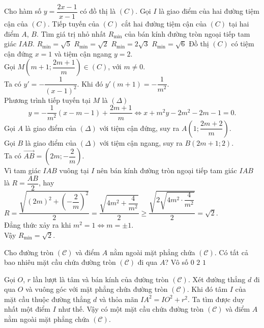 \begin{ex}%
 Cho hàm số $y=\dfrac{2x-1}{x-1}$ có đồ thị là $(C)$. Gọi $I$ là giao điểm của hai đường tiệm cận của $(C)$. Tiếp tuyến của $(C)$ cắt hai đường tiệm cận của $(C)$ tại hai điểm $A$, $B$. Tìm giá trị nhỏ nhất $R_{\min}$ của bán kính đường tròn ngoại tiếp tam giác $IAB$.
 \choice
  {$R_{\min}=\sqrt{5}$}
  {\True $R_{\min}=\sqrt{2}$}
  {$R_{\min}=2\sqrt{3}$}
  {$R_{\min}=\sqrt{6}$}
 \loigiai
  {
  Đồ thị $(C)$ có tiệm cận đứng $x=1$ và tiệm cận ngang $y = 2$.\\
  Gọi $M \left(m+1;\dfrac{2m+1}{m} \right) \in (C)$, với $m \neq 0$.\\
  Ta có $y' = -\dfrac{1}{(x-1)^2}$. Khi đó $y'(m+1) = -\dfrac{1}{m^2}$.\\
  Phương trình tiếp tuyến tại $M$ là $(\Delta)$
  $$y = -\dfrac{1}{m^2}(x-m-1)+\dfrac{2m+1}{m} \Leftrightarrow x + m^2y - 2m^2 - 2m - 1 = 0.$$
  Gọi $A$ là giao điểm của $(\Delta)$ với tiệm cận đứng, suy ra $A\left(1;\dfrac{2m+2}{m}\right)$.\\
  Gọi $B$ là giao điểm của $(\Delta)$ với tiệm cận ngang, suy ra $B\left(2m+1;2\right)$.\\
  Ta có $\overrightarrow{AB} = \left(2m;-\dfrac{2}{m} \right)$.\\
  Vì tam giác $IAB$ vuông tại $I$ nên bán kính đường tròn ngoại tiếp tam giác $IAB$ là $R = \dfrac{AB}{2}$, hay $R = \dfrac{\sqrt{(2m)^2 + \left(-\dfrac{2}{m}\right)^2}}{2} = \dfrac{\sqrt{4m^2 + \dfrac{4}{m^2}}}{2} \geq \dfrac{\sqrt{2\sqrt{4m^2 \cdot \dfrac{4}{m^2}}}}{2} = \sqrt{2}$.\\
  Đẳng thức xảy ra khi $m^2 = 1 \Leftrightarrow m = \pm 1$.\\
  Vậy $R_{\min}=\sqrt{2}$.
  }
\end{ex}


\begin{ex}%
 Cho đường tròn $(\mathscr{C})$ và điểm $A$ nằm ngoài mặt phẳng chứa $(\mathscr{C})$. Có tất cả bao nhiêu mặt cầu chứa đường tròn $(\mathscr{C})$ đi qua $A$?
 \choice
  {Vô số}
  {$0$}
  {$2$}
  {\True $1$}
 \loigiai
  {
  \immini
  {
  Gọi $O$, $r$ lần lượt là tâm và bán kính của đường tròn $(\mathscr{C})$. Xét đường thẳng $d$ đi qua $O$ và vuông góc với mặt phẳng chứa đường tròn $(\mathscr{C})$. Khi đó tâm $I$ của mặt cầu thuộc đường thẳng $d$ và thỏa mãn $IA^2=IO^2+r^2$. Ta tìm được duy nhất một điểm $I$ như thế. Vậy có một mặt cầu chứa đường tròn $(\mathscr{C})$ và điểm $A$ nằm ngoài mặt phẳng chứa $(\mathscr{C})$.
  }
  {
  }
  }
\end{ex}


